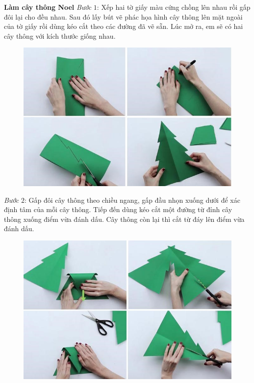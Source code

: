 \begin{multicols}{2}
	\vskip 0.1cm
	\textbf{\color{toancuabi}Làm cây thông Noel}
	\vskip 0.1cm
	\textit{Bước} $1$: Xếp hai tờ giấy màu cứng chồng lên nhau rồi gấp đôi lại cho đều nhau. Sau đó lấy bút vẽ phác họa hình cây thông lên mặt ngoài của tờ giấy rồi dùng kéo cắt theo các đường đã vẽ sẵn. Lúc mở ra, em sẽ có hai cây thông với kích thước giống nhau.
	\begin{figure}[H]
		\vspace*{-5pt}
		\centering
		\captionsetup{labelformat= empty, justification=centering}
		\includegraphics[width= 1\linewidth]{6}
		\vspace*{-15pt}
	\end{figure}
	\textit{Bước} $2$: Gấp đôi cây thông theo chiều ngang, gấp đầu nhọn xuống dưới để xác định tâm của mỗi cây thông. Tiếp đến dùng kéo cắt một đường từ đỉnh cây thông xuống điểm vừa đánh dấu. Cây thông còn lại thì cắt từ đáy lên điểm vừa đánh dấu.
	\begin{figure}[H]
		\vspace*{-5pt}
		\centering
		\captionsetup{labelformat= empty, justification=centering}
		\includegraphics[width= 1\linewidth]{7}

\end{figure}
\end{multicols}
